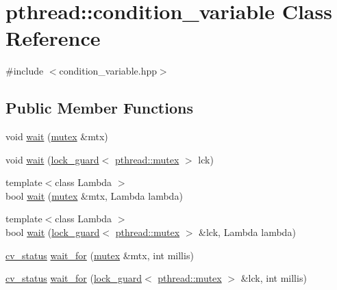 \hypertarget{classpthread_1_1condition__variable}{}\section{pthread\+:\+:condition\+\_\+variable Class Reference}
\label{classpthread_1_1condition__variable}


{\ttfamily \#include $<$condition\+\_\+variable.\+hpp$>$}

\subsection*{Public Member Functions}
\begin{DoxyCompactItemize}
\item 
void \hyperlink{classpthread_1_1condition__variable_a34247dacb9da1856f3a65bc868b6abb8}{wait} (\hyperlink{classpthread_1_1mutex}{mutex} \&mtx)
\item 
void \hyperlink{classpthread_1_1condition__variable_a9bb3e49f17ec1470c305d8b21daadf2a}{wait} (\hyperlink{classpthread_1_1lock__guard}{lock\+\_\+guard}$<$ \hyperlink{classpthread_1_1mutex}{pthread\+::mutex} $>$ lck)
\item 
{\footnotesize template$<$class Lambda $>$ }\\bool \hyperlink{classpthread_1_1condition__variable_a251a506415355171be3052b68bc8d2ec}{wait} (\hyperlink{classpthread_1_1mutex}{mutex} \&mtx, Lambda lambda)
\item 
{\footnotesize template$<$class Lambda $>$ }\\bool \hyperlink{classpthread_1_1condition__variable_a7b6c075d1588178301547bc60c59ceba}{wait} (\hyperlink{classpthread_1_1lock__guard}{lock\+\_\+guard}$<$ \hyperlink{classpthread_1_1mutex}{pthread\+::mutex} $>$ \&lck, Lambda lambda)
\item 
\hyperlink{group__concurrency_ga823f88a2bf448bd5bd5273b826830bdd}{cv\+\_\+status} \hyperlink{classpthread_1_1condition__variable_a804a305eefb4da8abecd1e6326b82785}{wait\+\_\+for} (\hyperlink{classpthread_1_1mutex}{mutex} \&mtx, int millis)
\item 
\hyperlink{group__concurrency_ga823f88a2bf448bd5bd5273b826830bdd}{cv\+\_\+status} \hyperlink{classpthread_1_1condition__variable_a1dfcedf00e9822587c7b20da9c060fd9}{wait\+\_\+for} (\hyperlink{classpthread_1_1lock__guard}{lock\+\_\+guard}$<$ \hyperlink{classpthread_1_1mutex}{pthread\+::mutex} $>$ \&lck, int millis)
\item 

\end{DoxyCompactItemize}

